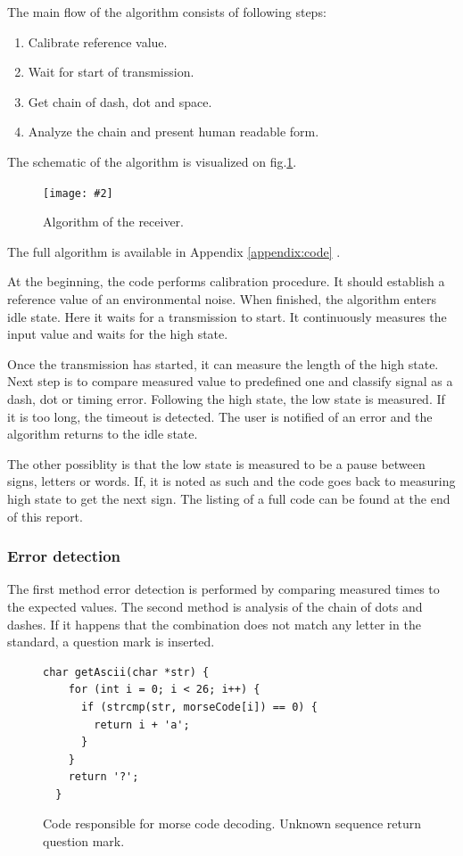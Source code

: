 \documentclass[12pt]{article}
\newcommand{\appendixCodeRef}
{
Appendix \ref{appendix:code}
}
\newcommand{\imageLabeled}[4]{
\begin{figure}[h]
	\begin{center}
		\texttt{[image: \#2]}
	\end{center}
  \caption{#1}
  \label{fig:#4}
\end{figure}}
\begin{document}
  The main flow of the algorithm consists of following steps:
  \begin{enumerate}
    \item Calibrate reference value.
    \item Wait for start of transmission.
    \item Get chain of dash, dot and space.
    \item Analyze the chain and present human readable form.
  \end{enumerate}
  The schematic of the algorithm is visualized on fig.\ref{fig:algo}.
  \imageLabeled{Algorithm of the receiver.}{algorithm_receiver.png}{0.2}{algo}
  The full algorithm is available in \appendixCodeRef.

  At the beginning, the code performs calibration procedure. It should establish a reference value of an environmental noise.
  When finished, the algorithm enters idle state. Here it waits for a transmission to start. It continuously measures the input value and waits for the high state.

  Once the transmission has started, it can measure the length of the high state. Next step is to compare measured value to predefined one and classify signal as a dash, dot or timing error.
  Following the high state, the low state is measured. If it is too long, the timeout is detected. The user is notified of an error and the algorithm
  returns to the idle state.

  The other possiblity is that the low state is measured to be a pause between signs, letters or words. If, it is noted as such and the code goes back to measuring high state to get the next sign.
  The listing of a full code can be found at the end of this report.
\newpage
  \subsubsection{Error detection}
  The first method error detection is performed by comparing measured times to the expected values.
  The second method is analysis of the chain of dots and dashes. If it happens that the combination does not match any letter in the standard, a question mark is inserted.
  \begin{figure}[h]
  \begin{lstlisting}[autogobble,style=CStyle]
  char getAscii(char *str) {
    for (int i = 0; i < 26; i++) {
      if (strcmp(str, morseCode[i]) == 0) {
        return i + 'a';
      }
    }
    return '?';
  }
  \end{lstlisting}
    \caption{Code responsible for morse code decoding. Unknown sequence return question mark.}
  \end{figure}
	\newpage
\end{document}
